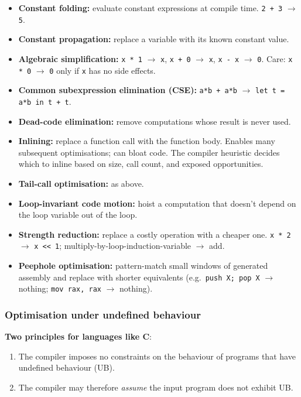 \documentclass[11pt,a4paper]{article}
\begin{document}
\begin{itemize}[leftmargin=*,itemsep=1pt]
  \item \textbf{Constant folding:} evaluate constant expressions at compile time. \verb|2 + 3| $\to$ \verb|5|.
  \item \textbf{Constant propagation:} replace a variable with its known constant value.
  \item \textbf{Algebraic simplification:} \verb|x * 1| $\to$ \verb|x|, \verb|x + 0| $\to$ \verb|x|, \verb|x - x| $\to$ \verb|0|. Care: \verb|x * 0| $\to$ \verb|0| only if \verb|x| has no side effects.
  \item \textbf{Common subexpression elimination (CSE):} \verb|a*b + a*b| $\to$ \verb|let t = a*b in t + t|.
  \item \textbf{Dead-code elimination:} remove computations whose result is never used.
  \item \textbf{Inlining:} replace a function call with the function body. Enables many subsequent optimisations; can bloat code. The compiler heuristic decides which to inline based on size, call count, and exposed opportunities.
  \item \textbf{Tail-call optimisation:} as above.
  \item \textbf{Loop-invariant code motion:} hoist a computation that doesn't depend on the loop variable out of the loop.
  \item \textbf{Strength reduction:} replace a costly operation with a cheaper one. \verb|x * 2| $\to$ \verb|x << 1|; multiply-by-loop-induction-variable $\to$ add.
  \item \textbf{Peephole optimisation:} pattern-match small windows of generated assembly and replace with shorter equivalents (e.g.\ \verb|push X; pop X| $\to$ nothing; \verb|mov rax, rax| $\to$ nothing).
\end{itemize}

\subsubsection*{Optimisation under undefined behaviour}

\textbf{Two principles for languages like C}:
\begin{enumerate}[leftmargin=*,itemsep=0pt]
  \item The compiler imposes no constraints on the behaviour of programs that have undefined behaviour (UB).
  \item The compiler may therefore \emph{assume} the input program does not exhibit UB.
\end{enumerate}
\end{document}
